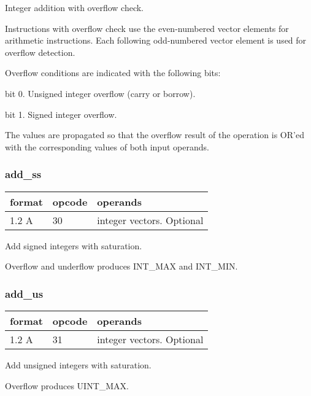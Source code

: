 \documentclass[forwardcom.tex]{subfiles}
\begin{document}
Integer addition with overflow check.
\vspace{2mm}

Instructions with overflow check use the even-numbered vector elements for arithmetic instructions. Each following odd-numbered vector element is used for overflow detection.
\vspace{2mm}

Overflow conditions are indicated with the following bits:
\vspace{2mm}

bit 0. Unsigned integer overflow (carry or borrow).

bit 1. Signed integer overflow.

\vspace{2mm}

The values are propagated so that the overflow result of the operation is OR'ed with the corresponding values of both input operands.
\vspace{2mm}

\subsubsection{add\_ss}
\label{table:addSsInstruction}
\begin{tabular}{|p{12mm}|p{12mm}|p{110mm}|}
\hline
\bfseries format & \bfseries opcode & \bfseries operands \\ \hline
1.2 A & 30 & integer vectors. Optional \\ \hline
\end{tabular}
\vspace{2mm}

Add signed integers with saturation.

Overflow and underflow produces INT\_MAX and INT\_MIN.

\subsubsection{add\_us}
\label{table:addUsInstruction}
\begin{tabular}{|p{12mm}|p{12mm}|p{110mm}|}
\hline
\bfseries format & \bfseries opcode & \bfseries operands \\ \hline
1.2 A & 31 & integer vectors. Optional \\ \hline
\end{tabular}
\vspace{2mm}

Add unsigned integers with saturation.

Overflow produces UINT\_MAX.
\end{document}
